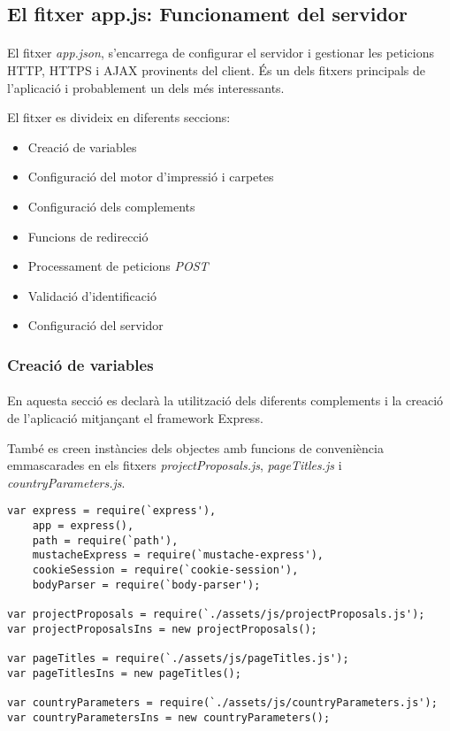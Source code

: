 \subsection{El fitxer app.js: Funcionament del servidor}

    \paragraph{}
    El fitxer \emph{app.json}, s'encarrega de configurar el servidor i gestionar les peticions HTTP, HTTPS i AJAX provinents del client. És un dels fitxers principals de l'aplicació i probablement un dels més interessants.

    El fitxer es divideix en diferents seccions:

    \begin{itemize}
        \item Creació de variables
        \item Configuració del motor d'impressió i carpetes
        \item Configuració dels complements
        \item Funcions de redirecció
        \item Processament de peticions \emph{POST}
        \item Validació d'identificació
        \item Configuració del servidor
    \end{itemize}


    \subsubsection{Creació de variables}

    \paragraph{}
    En aquesta secció es declarà la utilització dels diferents complements i la creació de l'aplicació mitjançant el framework Express.

    També es creen instàncies dels objectes amb funcions de conveniència em\-mas\-ca\-ra\-des en els fitxers \emph{projectProposals.js}, \emph{pageTitles.js} i \emph{countryParameters.js}.

    \begin{lstlisting}[style=rawOwn,caption={Declaració de variables en el servidor}]
var express = require(`express'),
    app = express(),
    path = require(`path'),
    mustacheExpress = require(`mustache-express'),
    cookieSession = require(`cookie-session'),
    bodyParser = require(`body-parser');

var projectProposals = require(`./assets/js/projectProposals.js');
var projectProposalsIns = new projectProposals();

var pageTitles = require(`./assets/js/pageTitles.js');
var pageTitlesIns = new pageTitles();

var countryParameters = require(`./assets/js/countryParameters.js');
var countryParametersIns = new countryParameters();
    \end{lstlisting}



